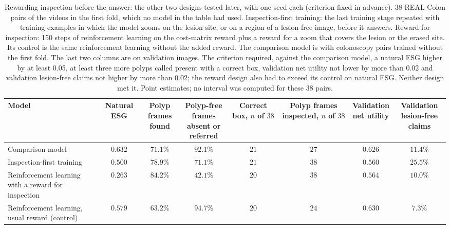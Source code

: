 \begin{table}[!htbp]
\caption{Rewarding inspection before the answer: the other two designs tested later, with one seed each (criterion fixed in advance). 38 REAL-Colon pairs of the videos in the first fold, which no model in the table had used. Inspection-first training: the last training stage repeated with training examples in which the model zooms on the lesion site, or on a region of a lesion-free image, before it answers. Reward for inspection: 150 steps of reinforcement learning on the cost-matrix reward plus a reward for a zoom that covers the lesion or the erased site. Its control is the same reinforcement learning without the added reward. The comparison model is \msp{} with colonoscopy pairs trained without the first fold. The last two columns are on validation images. The criterion required, against the comparison model, a natural ESG higher by at least 0.05, at least three more polyps called present with a correct box, validation net utility not lower by more than 0.02 and validation lesion-free claims not higher by more than 0.02; the reward design also had to exceed its control on natural ESG. Neither design met it. Point estimates; no interval was computed for these 38 pairs.}
\label{tab:s_inspect}
\centering
\footnotesize
\begin{adjustbox}{max width=\linewidth}
\begin{tabular}{l c cc cc cc}
\toprule
Model & Natural ESG & \shortstack{Polyp frames\\found} & \shortstack{Polyp-free frames\\absent or referred} & \shortstack{Correct box,\\$n$ of $38$} & \shortstack{Polyp frames\\inspected, $n$ of $38$} & \shortstack{Validation\\net utility} & \shortstack{Validation\\lesion-free claims} \\
\midrule
Comparison model & $0.632$ & $71.1\%$ & $92.1\%$ & $21$ & $27$ & $0.626$ & $11.4\%$ \\
Inspection-first training & $0.500$ & $78.9\%$ & $71.1\%$ & $21$ & $38$ & $0.560$ & $25.5\%$ \\
Reinforcement learning with a reward for inspection & $0.263$ & $84.2\%$ & $42.1\%$ & $20$ & $38$ & $0.564$ & $10.0\%$ \\
Reinforcement learning, usual reward (control) & $0.579$ & $63.2\%$ & $94.7\%$ & $20$ & $24$ & $0.630$ & $7.3\%$ \\
\bottomrule
\end{tabular}
\end{adjustbox}
\end{table}

